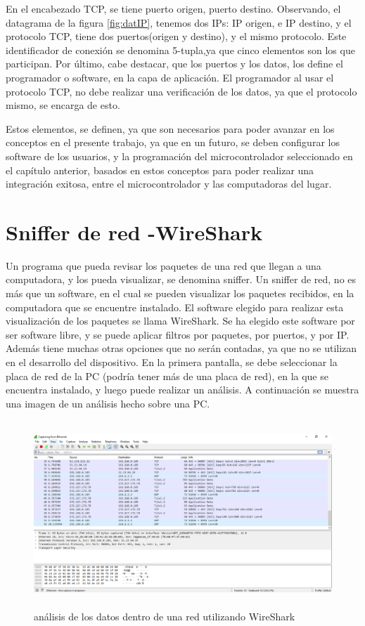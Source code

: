 	En el encabezado TCP, se tiene puerto origen, puerto destino. Observando, el datagrama de la figura \ref{fig:datIP}, tenemos dos IPs: IP origen, e IP destino, y el protocolo TCP, tiene dos puertos(origen y destino), y el mismo protocolo. Este identificador de conexión se denomina 5-tupla,ya que cinco elementos son los que participan. 
	Por último, cabe destacar, que los puertos y los datos, los define el programador o software, en la capa de aplicación. El programador al usar el protocolo TCP, no debe realizar una verificación de los datos, ya que el protocolo mismo, se encarga de esto. 
	
	Estos elementos, se definen, ya que son necesarios para poder avanzar en los conceptos en el presente trabajo, ya que en un futuro, se deben configurar los software de los usuarios, y la programación del microcontrolador seleccionado en el capítulo anterior, basados en estos conceptos para poder realizar una integración exitosa, entre el microcontrolador y las computadoras del lugar. 
	
\section{Sniffer de red -WireShark} 

Un programa que pueda revisar los paquetes de una red que llegan a una computadora, y los pueda visualizar, se denomina sniffer. Un sniffer de red, no es más que un software, en el cual se pueden visualizar los paquetes recibidos, en la computadora que se encuentre instalado. El software elegido para realizar esta visualización de los paquetes se llama WireShark. Se ha elegido este software por ser software libre, y se puede aplicar filtros por paquetes, por puertos, y por IP. Además tiene muchas otras opciones que no serán contadas, ya que no se utilizan en el desarrollo del dispositivo. En la primera pantalla, se debe seleccionar la placa de red de la PC (podría tener más de una placa de red), en la que se encuentra instalado, y luego puede realizar un análisis. A continuación se muestra una imagen de un análisis hecho sobre una PC.
\begin{figure}[H]
	\centering 
	\includegraphics[height=7cm]{wireshark}
	\caption{análisis de los datos dentro de una red utilizando WireShark}
\end{figure}


